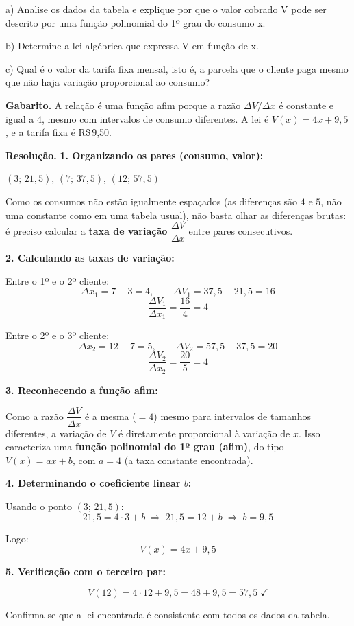 \documentclass[11pt,a4paper]{article}
\begin{document}
a) Analise os dados da tabela e explique por que o valor cobrado V pode ser descrito por uma função polinomial do 1º grau do consumo x.

b) Determine a lei algébrica que expressa V em função de x.

c) Qual é o valor da tarifa fixa mensal, isto é, a parcela que o cliente paga mesmo que não haja variação proporcional ao consumo?

\textbf{Gabarito.} A relação é uma função afim porque a razão $\Delta V/\Delta x$ é constante e igual a 4, mesmo com intervalos de consumo diferentes. A lei é $V(x) = 4x + 9{,}5$, e a tarifa fixa é R\$\,9,50.

\textbf{Resolução.} \textbf{1. Organizando os pares (consumo, valor):}

$(3;\,21{,}5)$, $(7;\,37{,}5)$, $(12;\,57{,}5)$

Como os consumos não estão igualmente espaçados (as diferenças são $4$ e $5$, não uma constante como em uma tabela usual), não basta olhar as diferenças brutas: é preciso calcular a \textbf{taxa de variação} $\dfrac{\Delta V}{\Delta x}$ entre pares consecutivos.

\textbf{2. Calculando as taxas de variação:}

Entre o 1º e o 2º cliente:
$$\Delta x_1 = 7-3=4, \qquad \Delta V_1 = 37{,}5-21{,}5=16$$
$$\frac{\Delta V_1}{\Delta x_1}=\frac{16}{4}=4$$

Entre o 2º e o 3º cliente:
$$\Delta x_2 = 12-7=5, \qquad \Delta V_2 = 57{,}5-37{,}5=20$$
$$\frac{\Delta V_2}{\Delta x_2}=\frac{20}{5}=4$$

\textbf{3. Reconhecendo a função afim:}

Como a razão $\dfrac{\Delta V}{\Delta x}$ é a mesma ($=4$) mesmo para intervalos de tamanhos diferentes, a variação de $V$ é diretamente proporcional à variação de $x$. Isso caracteriza uma \textbf{função polinomial do 1º grau (afim)}, do tipo $V(x)=ax+b$, com $a=4$ (a taxa constante encontrada).

\textbf{4. Determinando o coeficiente linear $b$:}

Usando o ponto $(3;\,21{,}5)$:
$$21{,}5 = 4\cdot 3 + b \;\Rightarrow\; 21{,}5 = 12 + b \;\Rightarrow\; b = 9{,}5$$

Logo:
$$V(x) = 4x + 9{,}5$$

\textbf{5. Verificação com o terceiro par:}

$$V(12) = 4\cdot 12 + 9{,}5 = 48+9{,}5 = 57{,}5 \;\checkmark$$

Confirma-se que a lei encontrada é consistente com todos os dados da tabela.
\end{document}
